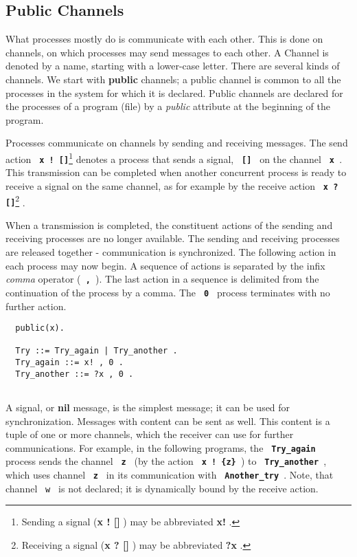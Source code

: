\documentclass[twoside,10pt]{report}
\begin{document}
\subsection{Public Channels}

What processes mostly do is communicate with each other. This is done
on channels, on which processes may send messages to each
other. A Channel is denoted by a name, starting with a lower-case
letter.  There are several kinds of channels. We start with {\bf public}
channels; a public channel is common to all the processes in the system
for which it is declared. Public channels are declared for the
processes of a program (file) by a {\em public} attribute at the beginning
of the program.

Processes communicate on channels by sending and receiving
messages. The send action {\bf \verb+ x ! []+}\footnote{
Sending a signal ({\bf x ! [] }) may be abbreviated {\bf  x! }.}
denotes a process that
sends a signal, {\bf \verb+ [] +} on the channel {\bf \verb+ x +}. This
transmission can be completed when another concurrent process is ready
to receive a signal on the same channel, as for example by the receive
action {\bf \verb+ x ? []+}\footnote{
Receiving a signal ({\bf  x ? [] }) may be abbreviated {\bf ?x  }.}
.

When a transmission is completed, the constituent actions of the
sending and receiving processes are no longer available.
The sending and receiving processes are released together -
communication is synchronized.  The following action in each process
may now begin.  A sequence of actions is separated by the infix {\em comma}
operator ({\bf \verb+ , +}).  The last action in a sequence is
delimited from the continuation of the process by a comma.
The {\bf \verb+ 0 +} process terminates with no further action.

\begin{verbatim}
  public(x).

  Try ::= Try_again | Try_another .
  Try_again ::= x! , 0 .
  Try_another ::= ?x , 0 .
 
\end{verbatim}
 
A signal, or {\bf nil} message, is the simplest message; it can be used
for synchronization. Messages with content can be sent as
well.  This content is a tuple of one or more channels, which the
receiver can use for further communications.  For example, in the
following programs, the {\bf \verb+ Try_again +} process sends the channel
{\bf \verb+ z +} (by the action {\bf \verb+ x ! {z} +})
to {\bf \verb+ Try_another +},
which  uses channel  {\bf \verb+ z +} in its communication with
{\bf \verb+ Another_try +}.  Note, that channel \verb+ w + is not declared;
it is dynamically bound by the receive action.
\end{document}
